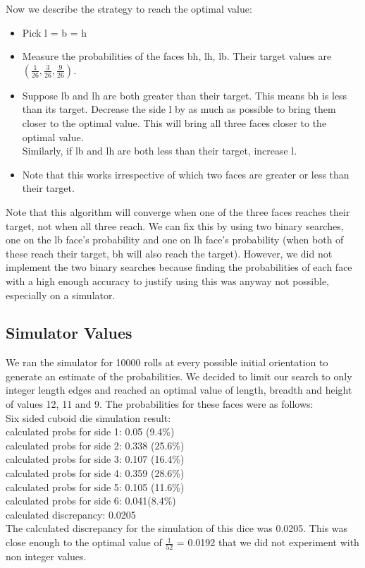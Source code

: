 Now we describe the strategy to reach the optimal value:\\
\begin{itemize}
    \item Pick l = b = h\\
    \item Measure the probabilities of the faces bh, lh, lb. Their target values are $(\frac{1}{26}, \frac{3}{26}, \frac{9}{26})$.\\
    \item Suppose lb and lh are both greater than their target. This means bh is less than its target. Decrease the side l by as much as possible to bring them closer to the optimal value. This will bring all three faces closer to the optimal value.\\
    Similarly, if lb and lh are both less than their target, increase l.\\
    \item Note that this works irrespective of which two faces are greater or less than their target.\\

\end{itemize}

Note that this algorithm will converge when one of the three faces reaches their target, not when all three reach. We can fix this by using two binary searches, one on the lb face's probability and one on lh face's probability (when both of these reach their target, bh will also reach the target). However, we did not implement the two binary searches because finding the probabilities of each face with a high enough accuracy to justify using this was anyway not possible, especially on a simulator.\\

\subsection{Simulator Values}
We ran the simulator for 10000 rolls at every possible initial orientation to generate an estimate of the probabilities. We decided to limit our search to only integer length edges and reached an optimal value of length, breadth and height of values 12, 11 and 9. The probabilities for these faces were as follows:\\
Six sided cuboid die simulation result:\\
calculated probs for side 1: 0.05 (9.4\%)\\
calculated probs for side 2: 0.338 (25.6\%)\\
calculated probs for side 3: 0.107 (16.4\%)\\
calculated probs for side 4: 0.359 (28.6\%)\\
calculated probs for side 5: 0.105 (11.6\%)\\
calculated probs for side 6: 0.041(8.4\%)\\
calculated discrepancy: 0.0205\\
The calculated discrepancy for the simulation of this dice was 0.0205. This was close enough to the optimal value of $\frac{1}{52}$ = 0.0192 that we did not experiment with non integer values.\\

